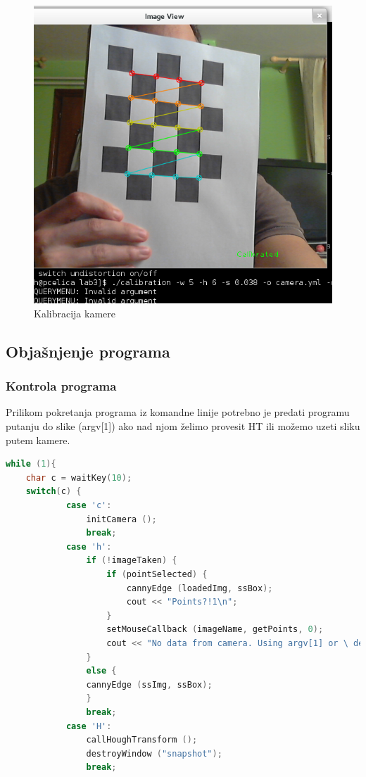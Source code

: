 \begin{figure}[h]
\centering
\includegraphics[scale=0.37]{images/lab3-01-calib.png}
\caption{Kalibracija kamere}
\label{fig:lab3-01-calib}
\end{figure}

\newpage
\subsection{Objašnjenje programa}

\subsubsection{Kontrola programa}

Prilikom pokretanja programa iz komandne linije potrebno je 
predati programu putanju do slike (argv[1]) ako nad njom želimo provesit
HT ili možemo uzeti sliku putem kamere.
\\
\begin{lstlisting}[language=C,caption={Kontrola programa tipkovnicom}]
while (1){
    char c = waitKey(10);
    switch(c) {
            case 'c':
                initCamera ();
                break;
            case 'h':
                if (!imageTaken) {
                    if (pointSelected) {
                        cannyEdge (loadedImg, ssBox);
                        cout << "Points?!1\n";
                    }
                    setMouseCallback (imageName, getPoints, 0);
                    cout << "No data from camera. Using argv[1] or \ default image\n";
                }
                else { 
                cannyEdge (ssImg, ssBox);
                }
                break;
            case 'H':
                callHoughTransform ();
                destroyWindow ("snapshot");
                break;
\end{lstlisting}

